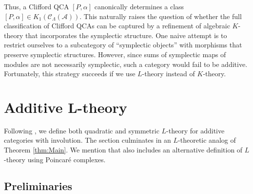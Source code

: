 \documentclass{article}
\theoremstyle{definition}
\begin{document}
Thus, a Clifford QCA $[P,\alpha]$ canonically determines a class
$[P,\alpha] \in K_1(\mathcal{C}_\Lambda(\mathcal{A}))$.
This naturally raises the question of whether the full classification of Clifford QCAs can be captured by a refinement of algebraic $K$-theory that incorporates the symplectic structure.
 One naive attempt is to restrict ourselves to a subcategory of ``symplectic objects'' with morphisms that preserve symplectic structures. However, since sums of symplectic maps of modules are not necessarily symplectic, such a category would fail to be additive. Fortunately, this strategy succeeds if we use $L$-theory instead of $K$-theory. 



\section{Additive L-theory}

Following \cite{ranicki1989additive}, we define both quadratic and symmetric $L$-theory for additive categories with involution. The section culminates in an $L$-theoretic analog of Theorem \ref{thm:Main}. We mention that \cite{ranicki1973algebraic, ranicki1989additive} also includes an alternative definition of $L$-theory using Poincar\'e complexes. 

\subsection{Preliminaries}
\end{document}
